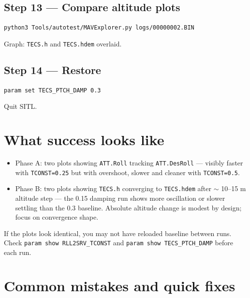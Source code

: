 \documentclass[a4paper,11pt,twoside]{article}
\begin{document}
\subsection*{Step 13 --- Compare altitude plots}
\begin{Verbatim}[frame=single,fontsize=\small]
python3 Tools/autotest/MAVExplorer.py logs/00000002.BIN
\end{Verbatim}
Graph: \texttt{TECS.h} and \texttt{TECS.hdem} overlaid.

\subsection*{Step 14 --- Restore}
\begin{Verbatim}[frame=single,fontsize=\small]
param set TECS_PTCH_DAMP 0.3
\end{Verbatim}
Quit SITL.

\section*{What success looks like}
\begin{itemize}
  \item Phase A: two plots showing \texttt{ATT.Roll} tracking \texttt{ATT.DesRoll} --- visibly faster with \texttt{TCONST=0.25} but with overshoot, slower and cleaner with \texttt{TCONST=0.5}.
  \item Phase B: two plots showing \texttt{TECS.h} converging to \texttt{TECS.hdem} after $\sim$ 10--15 m altitude step --- the 0.15 damping run shows more oscillation or slower settling than the 0.3 baseline. Absolute altitude change is modest by design; focus on convergence shape.
\end{itemize}

If the plots look identical, you may not have reloaded baseline between runs. Check \texttt{param show RLL2SRV\_TCONST} and \texttt{param show TECS\_PTCH\_DAMP} before each run.

\section*{Common mistakes and quick fixes}
\end{document}
